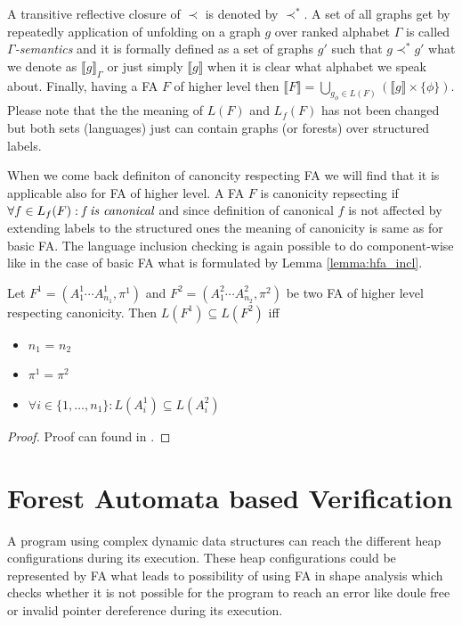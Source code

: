 A transitive reflective closure of $\prec$ is denoted by $\prec^*$.
A set of all graphs get by repeatedly application of unfolding on a graph $g$ over ranked alphabet $\Gamma$ is called
\emph{$\Gamma$-semantics} and it is formally defined as a set of graphs $g'$ such that $g \prec^* g'$
what we denote as $\llbracket g \rrbracket_\Gamma$ or just simply $\llbracket g \rrbracket$ when it is
clear what alphabet we speak about.
Finally, having a FA $F$ of higher level then $\llbracket F \rrbracket = \bigcup_{g_\phi \in L(F)} (\llbracket g \rrbracket \times \{\phi\})$.
Please note that the the meaning of $L(F)$ and $L_f(F)$ has not been changed but both sets (languages) just can contain graphs (or forests)
over structured labels.

When we come back definiton of canoncity respecting FA we will find that it is applicable also for FA of higher level.
A FA $F$ is canonicity repsecting if $\forall f \in L_f(F): \emph{f is canonical}$ and since definition of canonical $f$
is not affected by extending labels to the structured ones the meaning of canonicity is same as for basic FA.
The language inclusion checking is again possible to do component-wise like in the case of basic FA what is
formulated by Lemma \ref{lemma:hfa_incl}.

\begin{lemma}
	Let $F^1 = (A_1^1\cdots A_{n_1}^1, \pi^1)$ and $F^2 = (A_1^2\cdots A_{n_2}^2, \pi^2)$
	be two FA of higher level respecting canonicity.
	Then $L(F^1) \subseteq L(F^2)$ iff
	\begin{itemize}
			\item $n_1$ = $n_2$
			\item $\pi^1 = \pi^2$
			\item $\forall i \in \{1,\ldots,n_1\}: L(A_i^1) \subseteq L(A_i^2)$
	\end{itemize}
\end{lemma}
\begin{proof}
	Proof can found in \cite{cav11tr}.
\end{proof}


\chapter{Forest Automata based Verification}
\label{ch:fav}

A program using complex dynamic data structures can reach the different heap configurations
during its execution.
These heap configurations could be represented by FA what leads to possibility
of using FA in shape analysis which checks whether it is not possible for the program to reach an error like doule free or
invalid pointer dereference during its execution.

